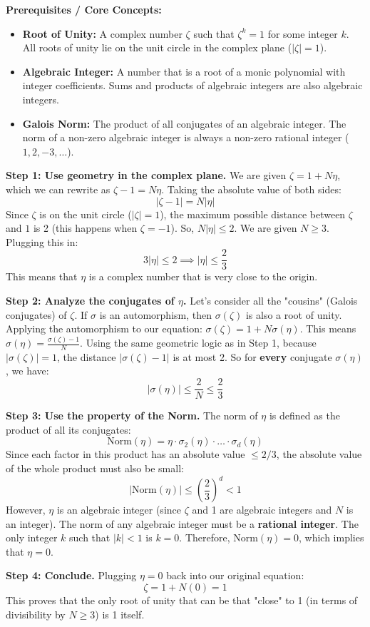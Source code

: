 \begin{solution}
\textbf{Prerequisites / Core Concepts:}
\begin{itemize}
    \item \textbf{Root of Unity:} A complex number $\zeta$ such that $\zeta^k = 1$ for some integer $k$. All roots of unity lie on the unit circle in the complex plane ($|\zeta| = 1$).
    \item \textbf{Algebraic Integer:} A number that is a root of a monic polynomial with integer coefficients. Sums and products of algebraic integers are also algebraic integers.
    \item \textbf{Galois Norm:} The product of all conjugates of an algebraic integer. The norm of a non-zero algebraic integer is always a non-zero rational integer ($1, 2, -3, \dots$).
\end{itemize}

\textbf{Step 1: Use geometry in the complex plane.}
We are given $\zeta = 1 + N \eta$, which we can rewrite as $\zeta - 1 = N \eta$.
Taking the absolute value of both sides:
\[ |\zeta - 1| = N |\eta| \]
Since $\zeta$ is on the unit circle ($|\zeta|=1$), the maximum possible distance between $\zeta$ and $1$ is 2 (this happens when $\zeta = -1$).
So, $N |\eta| \leq 2$.
We are given $N \geq 3$. Plugging this in:
\[ 3 |\eta| \leq 2 \implies |\eta| \leq \frac{2}{3} \]
This means that $\eta$ is a complex number that is very close to the origin.

\textbf{Step 2: Analyze the conjugates of $\eta$.}
Let's consider all the "cousins" (Galois conjugates) of $\zeta$. If $\sigma$ is an automorphism, then $\sigma(\zeta)$ is also a root of unity.
Applying the automorphism to our equation: $\sigma(\zeta) = 1 + N \sigma(\eta)$.
This means $\sigma(\eta) = \frac{\sigma(\zeta) - 1}{N}$.
Using the same geometric logic as in Step 1, because $|\sigma(\zeta)| = 1$, the distance $|\sigma(\zeta) - 1|$ is at most 2.
So for \textbf{every} conjugate $\sigma(\eta)$, we have:
\[ |\sigma(\eta)| \leq \frac{2}{N} \leq \frac{2}{3} \]

\textbf{Step 3: Use the property of the Norm.}
The norm of $\eta$ is defined as the product of all its conjugates:
\[ \text{Norm}(\eta) = \eta \cdot \sigma_2(\eta) \cdot \dots \cdot \sigma_d(\eta) \]
Since each factor in this product has an absolute value $\leq 2/3$, the absolute value of the whole product must also be small:
\[ |\text{Norm}(\eta)| \leq \left(\frac{2}{3}\right)^d < 1 \]
However, $\eta$ is an algebraic integer (since $\zeta$ and 1 are algebraic integers and $N$ is an integer). The norm of any algebraic integer must be a \textbf{rational integer}.
The only integer $k$ such that $|k| < 1$ is $k = 0$.
Therefore, $\text{Norm}(\eta) = 0$, which implies that $\eta = 0$.

\textbf{Step 4: Conclude.}
Plugging $\eta = 0$ back into our original equation:
\[ \zeta = 1 + N(0) = 1 \]
This proves that the only root of unity that can be that "close" to 1 (in terms of divisibility by $N \geq 3$) is 1 itself.
\end{solution}

